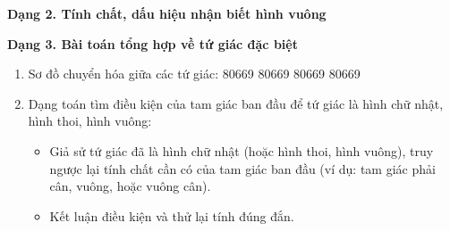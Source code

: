 \textbf{Dạng 2. Tính chất, dấu hiệu nhận biết hình vuông}

\textbf{Dạng 3. Bài toán tổng hợp về tứ giác đặc biệt}
\begin{enumerate}
\item Sơ đồ chuyển hóa giữa các tứ giác:
80669      80669
80669      80669
\item Dạng toán tìm điều kiện của tam giác ban đầu để tứ giác là hình chữ nhật, hình thoi, hình vuông:
\begin{itemize}
\item Giả sử tứ giác đã là hình chữ nhật (hoặc hình thoi, hình vuông), truy ngược lại tính chất cần có của tam giác ban đầu (ví dụ: tam giác phải cân, vuông, hoặc vuông cân).
\item Kết luận điều kiện và thử lại tính đúng đắn.
\end{itemize}
\end{enumerate}
